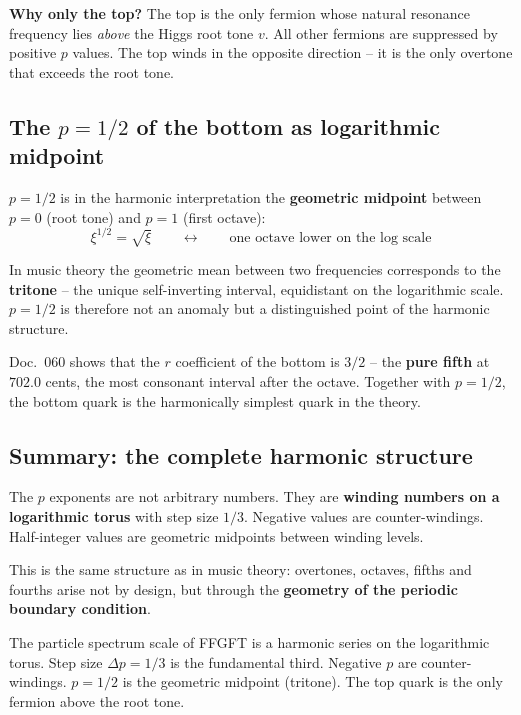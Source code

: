 \textbf{Why only the top?} The top is the only fermion whose natural
resonance frequency lies \emph{above} the Higgs root tone $v$. All
other fermions are suppressed by positive $p$ values. The top winds
in the opposite direction -- it is the only overtone that exceeds
the root tone.

\subsection{The $p = 1/2$ of the bottom as logarithmic midpoint}

$p = 1/2$ is in the harmonic interpretation the \textbf{geometric
midpoint} between $p = 0$ (root tone) and $p = 1$ (first octave):
\begin{equation}
    \xi^{1/2} = \sqrt{\xi} \qquad \longleftrightarrow \qquad
    \text{one octave lower on the log scale}
\end{equation}

In music theory the geometric mean between two frequencies corresponds
to the \textbf{tritone} -- the unique self-inverting interval, equidistant
on the logarithmic scale. $p = 1/2$ is therefore not an anomaly but
a distinguished point of the harmonic structure.

Doc.~060 shows that the $r$ coefficient of the bottom is $3/2$ --
the \textbf{pure fifth} at $702.0$ cents, the most consonant interval
after the octave. Together with $p = 1/2$, the bottom quark is the
harmonically simplest quark in the theory.

\subsection{Summary: the complete harmonic structure}

The $p$ exponents are not arbitrary numbers. They are
\textbf{winding numbers on a logarithmic torus} with step size $1/3$.
Negative values are counter-windings. Half-integer values are geometric
midpoints between winding levels.

This is the same structure as in music theory: overtones, octaves,
fifths and fourths arise not by design, but through the
\textbf{geometry of the periodic boundary condition}.

\begin{predbox}
The particle spectrum scale of FFGFT is a harmonic series on the
logarithmic torus. Step size $\Delta p = 1/3$ is the fundamental third.
Negative $p$ are counter-windings. $p = 1/2$ is the geometric midpoint
(tritone). The top quark is the only fermion above the root tone.
\end{predbox}

